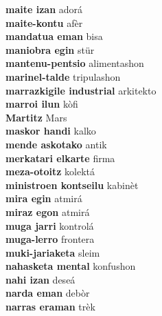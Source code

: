 \textbf{ maite izan  } adorá \\
\textbf{ maite-kontu  } afèr \\
\textbf{ mandatua eman  } bisa \\
\textbf{ maniobra egin  } stür \\
\textbf{ mantenu-pentsio  } alimentashon \\
\textbf{ marinel-talde  } tripulashon \\
\textbf{ marrazkigile industrial  } arkitekto \\
\textbf{ marroi ilun  } kòfi \\
\textbf{ Martitz  } Mars \\
\textbf{ maskor handi  } kalko \\
\textbf{ mende askotako  } antik \\
\textbf{ merkatari elkarte  } firma \\
\textbf{ meza-otoitz  } kolektá \\
\textbf{ ministroen kontseilu  } kabinèt \\
\textbf{ mira egin  } atmirá \\
\textbf{ miraz egon  } atmirá \\
\textbf{ muga jarri  } kontrolá \\
\textbf{ muga-lerro  } frontera \\
\textbf{ muki-jariaketa  } sleim \\
\textbf{ nahasketa mental  } konfushon \\
\textbf{ nahi izan  } deseá \\
\textbf{ narda eman  } debòr \\
\textbf{ narras eraman  } trèk \\
